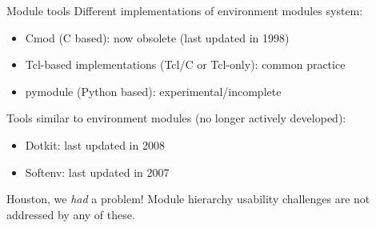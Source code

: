 \documentclass[10pt,xcolor={usenames,dvipsnames}]{beamer}
\begin{document}

\begin{frame}{Module tools}
Different implementations of environment modules system:
\begin{itemize}
    \item
        Cmod (C based): now obsolete (last updated in 1998)
    \item
        Tcl-based implementations (Tcl/C or Tcl-only): common practice
    \item
        pymodule (Python based): experimental/incomplete
\end{itemize}
Tools similar to environment modules (no longer actively developed):
\begin{itemize}
    \item
        Dotkit: last updated in 2008
    \item
        Softenv: last updated in 2007
\end{itemize}

\begin{center}
    \begin{minipage}{0.9\textwidth}
        \begin{alertblock}{\small Houston, we \emph{had} a problem!}
            \footnotesize
            Module hierarchy usability challenges are not addressed by any of these.
        \end{alertblock}
    \end{minipage}
\end{center}
\end{frame}

\end{document}
